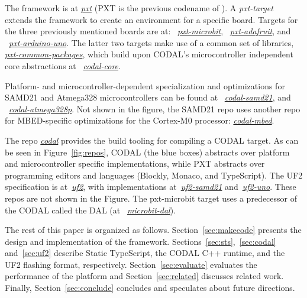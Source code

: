 The \MC framework 
is at \emph{\href{https://github.com/microsoft/pxt}{pxt}} (PXT is the previous codename of \MC). 
A \emph{pxt-target} extends the framework to create an environment for a specific board. Targets
for the three previously mentioned boards are at: 
~\emph{\href{https://github.com/microsoft/pxt-microbit}{pxt-microbit}}, 
~\emph{\href{https://github.com/microsoft/pxt-adafruit}{pxt-adafruit}}, and
~\emph{\href{https://github.com/microsoft/pxt-arduino-uno}{pxt-arduino-uno}}.
The latter two targets make use of a common set of libraries, 
\emph{\href{https://github.com/microsoft/pxt-common-packages}{pxt-common-packages}},
which build upon CODAL's microcontroller independent core abstractions at
~\emph{\href{https://github.com/lancaster-university/codal-core}{codal-core}}.  

Platform- and microcontroller-dependent specialization and optimizations for 
SAMD21 and Atmega328 microcontrollers can be found at
~\emph{\href{https://github.com/lancaster-university/codal-samd21}{codal-samd21}}, 
and
~\emph{\href{https://github.com/lancaster-university/codal-atmega328p}{codal-atmega328p}}.
Not shown in the figure, the SAMD21 repo uses another repo for
MBED-specific optimizations for the Cortex-M0 processor: \emph{\href{https://github.com/lancaster-university/codal-mbed}{codal-mbed}}.

The repo \emph{\href{https://github.com/lancaster-university/codal}{codal}} provides the
build tooling for compiling a CODAL target.  As can be seen in Figure~\ref{fig:repos}, 
CODAL (the blue boxes) abstracts over platform and microcontroller specific
implementations, while PXT abstracts over programming editors
and languages (Blockly, Monaco, and TypeScript).
The UF2 specification is at~\emph{\href{https://github.com/microsoft/uf2}{uf2}},
with implementations at~\emph{\href{https://github.com/microsoft/uf2-samd21}{uf2-samd21}}
and~\emph{\href{https://github.com/mmoskal/uf2-uno}{uf2-uno}}. These repos are not
shown in the Figure. 
The pxt-microbit target uses a predecessor of the CODAL called the DAL (at
~\emph{\href{https://github.com/lancaster-university/microbit-dal}{microbit-dal}}).

The rest of this paper is organized as follows. Section~\ref{sec:makecode} presents the design and implementation of the \MC framework. 
Sections~\ref{sec:sts},~\ref{sec:codal} and~\ref{sec:uf2} describe Static TypeScript, the CODAL C++ runtime, and the UF2 flashing format,
respectively.  Section~\ref{sec:evaluate} evaluates the performance of the platform and
Section~\ref{sec:related} discusses related work. Finally, Section~\ref{sec:conclude} concludes and speculates about future directions. 
